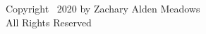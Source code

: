 \thispagestyle{empty} 
\null
\noindent
\vfill
\begin{center}
    Copyright \textcopyright\ 2020 by Zachary Alden Meadows\\
    All Rights Reserved
\end{center}
\vfill
\newpage